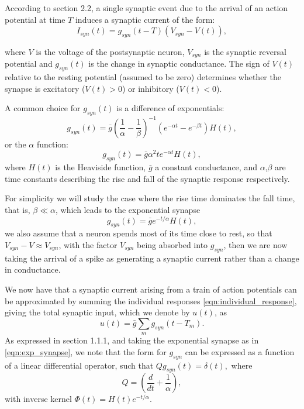 \documentclass{uonmathreport}
\begin{document}
According to \cite{bressloff2011spatiotemporal} section 2.2, a single synaptic event due to the arrival of an action potential at time $T$ induces a synaptic current of the form:
\begin{equation}\label{eqn:individual_response}
I_{syn}(t)=g_{syn}(t - T)(V_{syn} - V(t)),
\end{equation}

where $V$ is the voltage of the postsynaptic neuron, $V_{syn}$ is the synaptic reversal potential and $g_{syn}(t)$ is the change in synaptic conductance. The sign of $V(t)$ relative to the resting potential (assumed to be zero) determines whether the synapse is excitatory ($V(t) > 0$) or inhibitory ($V(t) < 0$).

A common choice for $g_{syn}(t)$ is a difference of exponentials:
\begin{equation}
g_{syn}(t) = \bar{g}(\frac{1}{\alpha} - \frac{1}{\beta})^{-1}
(e^{-\alpha t} - e^{-\beta t})H(t),
\end{equation}
or the $\alpha$ function:
\begin{equation}
g_{syn}(t) = \bar{g} \alpha^2 t e^{-\alpha t}H(t),
\end{equation}
where $H(t)$ is the Heaviside function, $\bar{g}$ a constant conductance, and $\alpha$,$\beta$ are time constants describing the rise and fall of the synaptic response respectively.

For simplicity we will study the case where the rise time dominates the fall time, that is, $\beta \ll \alpha$, which leads to the exponential synapse
\begin{equation}\label{eqn:exp_synapse}
g_{syn}(t) = \bar{g} e^{-t/\alpha}H(t),
\end{equation}
we also assume that a neuron spends most of its time close to rest, so that $V_{syn} - V \approx V_{syn}$, with the factor $V_{syn}$ being absorbed into $g_{syn}$, then we are now taking the arrival of a spike as generating a synaptic current rather than a change in conductance.

We now have that a synaptic current arising from a train of action potentials can be approximated by summing the individual responses \ref{eqn:individual_response}, giving the total synaptic input, which we denote by $u(t)$, as
\begin{equation}\label{eqn:train_spikes}
u(t) = \bar g \sum_m g_{syn}(t-T_m).
\end{equation}
As expressed in \cite{coombes2012NeuralFields} section 1.1.1, and taking the exponential synapse as in \ref{eqn:exp_synapse}, we note that the form for $g_{syn}$ can be expressed as a function of a linear differential operator, such that $Qg_{syn}(t) = \delta(t),$ where
\begin{equation}
Q = (\frac{d}{dt} + \frac{1}{\alpha}),
\end{equation} 
with inverse kernel $\Phi(t) = H(t)e^{-t/\alpha}.$
\end{document}
